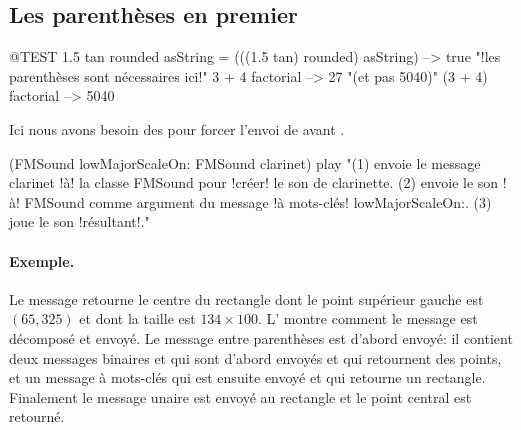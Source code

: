 \documentclass[a4paper,10pt,twoside]{book}
\begin{document}
\subsection{Les parenth\`eses en premier}


\begin{code}{@TEST}
1.5 tan rounded asString = (((1.5 tan) rounded) asString) --> true    "!les parenth\`eses sont n\'ecessaires ici!"
3 + 4 factorial   --> 27    "(et pas 5040)"
(3 + 4) factorial --> 5040
\end{code}

Ici nous avons besoin des  pour forcer l'envoi de  avant .
\begin{code}{}
(FMSound lowMajorScaleOn: FMSound clarinet) play 
"(1) envoie le message clarinet !\`a! la classe FMSound pour !cr\'eer! le son de clarinette.
 (2) envoie le son !\`a! FMSound comme argument du message !\`a mots-cl\'es! lowMajorScaleOn:.
 (3) joue le son !r\'esultant!."
\end{code}



\paragraph{Exemple.}
Le message  retourne le centre
du rectangle dont le point sup\'erieur gauche est $(65, 325)$ et dont
la taille est $134{\times}100$. L' montre comment le
message est d\'ecompos\'e et envoy\'e. Le message entre parenth\`eses
est d'abord envoy\'e: il contient deux messages binaires 
et  qui sont d'abord envoy\'es et qui retournent des
points, et un message \`a mots-cl\'es  qui est ensuite
envoy\'e et qui retourne un rectangle. Finalement le message unaire
 est envoy\'e au rectangle et le point central est retourn\'e.
\end{document}
